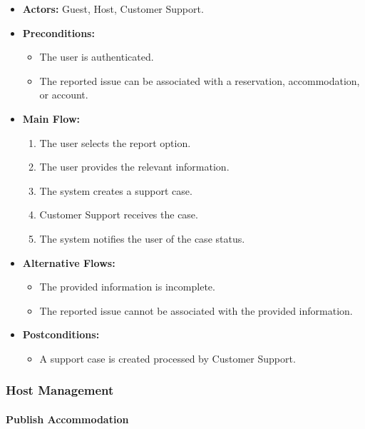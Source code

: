 \begin{itemize}
    \item \textbf{Actors:} Guest, Host, Customer Support.
    
    \item \textbf{Preconditions:}
    \begin{itemize}
        \item The user is authenticated.
        \item The reported issue can be associated with a reservation, accommodation, or account.
    \end{itemize}
    
    \item \textbf{Main Flow:}
    \begin{enumerate}
        \item The user selects the report option.
        \item The user provides the relevant information.
        \item The system creates a support case.
        \item Customer Support receives the case.
        \item The system notifies the user of the case status.
    \end{enumerate}
    
    \item \textbf{Alternative Flows:}
    \begin{itemize}
        \item The provided information is incomplete.
        \item The reported issue cannot be associated with the provided information.
    \end{itemize}
    
    \item \textbf{Postconditions:}
    \begin{itemize}
        \item A support case is created processed by Customer Support.
    \end{itemize}
\end{itemize}


\subsubsection{Host Management}

\paragraph{Publish Accommodation}

